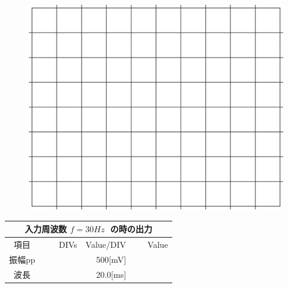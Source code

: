 \documentclass[uplatex,a4paper,11pt,oneside,openany]{jsbook}
\begin{document}
\begin{multicols}{2}
  \begin{figure}[H]
     \centering
      \includegraphics[keepaspectratio, scale=0.28, angle=0]
                  {figs/eps/grid.eps}
                  \label{fig:grid20mV}
  \end{figure}

  \begin{spacing}{1.5}
  \begin{tabular}{|c||r|r|r|}
    \multicolumn{4}{c}{入力周波数 $f=30Hz\;$ の時の出力} \\ \hline
    項目 & DIVs & Value/DIV & Value \\ \hline \hline
    振幅pp & 　　　　 & 500[mV]& 　　　　 \\ \hline
    波長 & 　　　　 & 20.0[ms]& 　　　　 \\ \hline
  \end{tabular}
\end{spacing}
\end{multicols}

\vfill

\newpage
\end{document}
